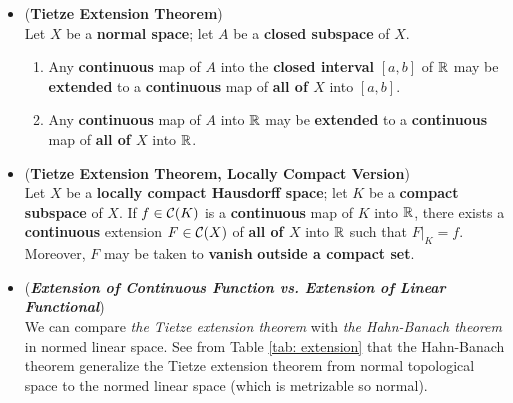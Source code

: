 \documentclass[11pt]{article}
\begin{document}
\begin{itemize}
\item \begin{theorem} (\textbf{Tietze Extension Theorem}) \citep{munkres2000topology, reed1980methods}\\
Let $X$ be a \textbf{normal space}; let $A$ be a \textbf{closed subspace} of $X$.
\begin{enumerate}
\item Any \textbf{continuous} map of $A$ into the \textbf{closed interval} $[a, b]$ of ${\mathbb R}$ may be \textbf{extended}
to a \textbf{continuous} map of \textbf{all of $X$} into $[a, b]$.
\item Any \textbf{continuous} map of $A$ into ${\mathbb R}$ may be \textbf{extended} to a \textbf{continuous} map of \textbf{all of $X$} into ${\mathbb R}$.
\end{enumerate}
\end{theorem}


\item \begin{theorem} (\textbf{Tietze Extension Theorem, Locally Compact Version}) \citep{folland2013real}\\
Let $X$ be a \textbf{locally compact Hausdorff space}; let $K$ be a \textbf{compact subspace} of $X$. If $f \in {\mathcal C}(K)$ is a \textbf{continuous} map of $K$ into ${\mathbb R}$,   there exists a \textbf{continuous} extension $F \in {\mathcal C}(X)$ of \textbf{all of $X$} into ${\mathbb R}$ such that $F|_{K} = f$. Moreover, $F$ may be taken to \textbf{vanish}\textbf{ outside a compact set}.
\end{theorem} 

\item \begin{remark} (\emph{\textbf{Extension of Continuous Function vs. Extension of Linear Functional}})\\
We can compare \emph{the Tietze extension theorem} with \emph{the Hahn-Banach theorem} in normed linear space. See from Table \ref{tab: extension} that the Hahn-Banach theorem generalize the Tietze extension theorem from normal topological space to the normed linear space (which is metrizable so normal).
\end{remark}
\end{itemize}
\end{document}
